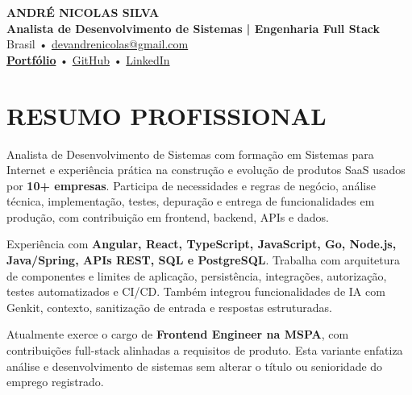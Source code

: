 \documentclass[10pt,a4paper]{article}
\begin{document}

\begin{center}

    {\LARGE \textbf{ANDRÉ NICOLAS SILVA}} \\[-2pt]

    {\normalsize \textbf{Analista de Desenvolvimento de Sistemas | Engenharia Full Stack}} \\[1pt]

    \footnotesize
    Brasil \quad • \quad
    \href{mailto:devandrenicolas@gmail.com}{devandrenicolas@gmail.com} \\[-1pt]

    \textbf{\href{https://portfolio-andrenicolas.vercel.app}{Portfólio}}
    \quad • \quad
    \href{https://github.com/devAndreNicolas}{GitHub}
    \quad • \quad
    \href{https://www.linkedin.com/in/devandrenicolas}{LinkedIn}

\end{center}

\vspace{-3pt}


\section*{RESUMO PROFISSIONAL}

\footnotesize

Analista de Desenvolvimento de Sistemas com formação em Sistemas para Internet e experiência prática na construção e evolução de produtos SaaS usados por \textbf{10+ empresas}. Participa de necessidades e regras de negócio, análise técnica, implementação, testes, depuração e entrega de funcionalidades em produção, com contribuição em frontend, backend, APIs e dados.

Experiência com \textbf{Angular, React, TypeScript, JavaScript, Go, Node.js, Java/Spring, APIs REST, SQL e PostgreSQL}. Trabalha com arquitetura de componentes e limites de aplicação, persistência, integrações, autorização, testes automatizados e CI/CD. Também integrou funcionalidades de IA com Genkit, contexto, sanitização de entrada e respostas estruturadas.

Atualmente exerce o cargo de \textbf{Frontend Engineer na MSPA}, com contribuições full-stack alinhadas a requisitos de produto. Esta variante enfatiza análise e desenvolvimento de sistemas sem alterar o título ou senioridade do emprego registrado.
\end{document}
